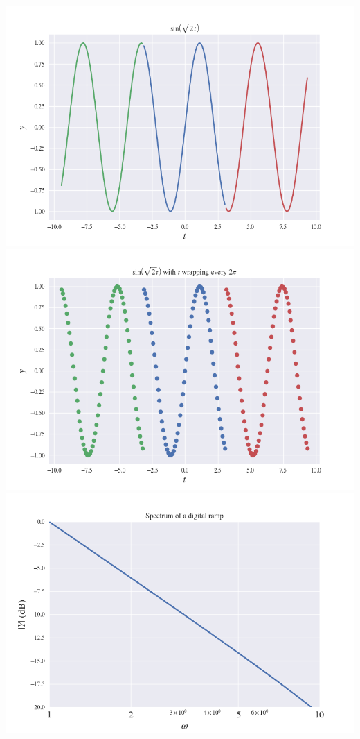 \documentclass[12pt]{article}
\begin{document}
\begin{center}
    \includegraphics[scale=0.8]{images/fig3.png}
    \includegraphics[scale=0.8]{images/fig4.png}
    \includegraphics[scale=0.8]{images/fig5.png}
\end{center}
\end{document}
